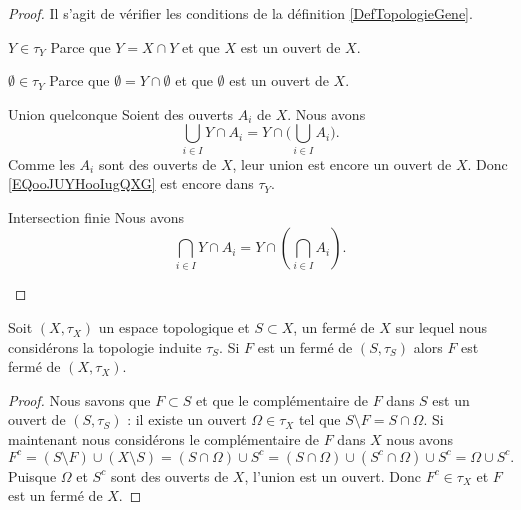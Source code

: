 \begin{proof}
	Il s'agit de vérifier les conditions de la définition \ref{DefTopologieGene}.

	\begin{subproof}
		\item[\( Y\in \tau_Y\)]
		Parce que \( Y=X\cap Y\) et que \( X\) est un ouvert de \( X\).
		\item[\( \emptyset\in \tau_Y\)]
		Parce que \( \emptyset = Y\cap\emptyset\) et que \( \emptyset\) est un ouvert de \( X\).
		\item[Union quelconque]
		Soient des ouverts \( A_i\) de \( X\). Nous avons
		\begin{equation}        \label{EQooJUYHooIugQXG}
			\bigcup_{i\in I}Y\cap A_i=Y\cap\big( \bigcup_{i\in I}A_i \big).
		\end{equation}
		Comme les \( A_i\) sont des ouverts de \( X\), leur union est encore un ouvert de \( X\). Donc \eqref{EQooJUYHooIugQXG} est encore dans \( \tau_Y\).
		\item[Intersection finie]
		Nous avons
		\begin{equation}
			\bigcap_{i\in I}Y\cap A_i=Y\cap\left( \bigcap_{i\in I}A_i \right).
		\end{equation}
	\end{subproof}
\end{proof}


\begin{lemma}        \label{LemBWSUooCCGvax}
	Soit \( (X,\tau_X)\) un espace topologique et \( S\subset X\), un fermé de \( X\) sur lequel nous considérons la topologie induite \( \tau_S\). Si \( F\) est un fermé de \( (S,\tau_S)\) alors \( F\) est fermé de \( (X,\tau_X)\).
\end{lemma}

\begin{proof}
	Nous savons que \( F\subset S\) et que le complémentaire de \( F\) dans \( S\) est un ouvert de \( (S,\tau_S)\) : il existe un ouvert \( \Omega\in \tau_X\) tel que \( S\setminus F=S\cap \Omega\). Si maintenant nous considérons le complémentaire de \( F\) dans \( X\) nous avons
	\begin{equation}
		F^c=(S\setminus F)\cup (X\setminus S)=(S\cap \Omega)\cup S^c=(S\cap \Omega)\cup(S^c\cap \Omega)\cup S^c=\Omega\cup S^c.
	\end{equation}
	Puisque \( \Omega\) et \( S^c\) sont des ouverts de \( X\), l'union est un ouvert. Donc \( F^c\in \tau_X\) et \( F\) est un fermé de \( X\).
\end{proof}

